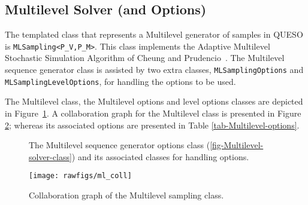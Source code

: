\subsection{Multilevel Solver (and Options)}\label{sec:ML}


The templated class that represents a Multilevel generator of samples in QUESO is \linebreak \verb+MLSampling<P_V,P_M>+. This class implements the Adaptive Multilevel Stochastic Simulation Algorithm of Cheung and Prudencio~\cite{CheungPrudencio2012}.
The Multilevel sequence generator class is assisted by two extra classes, \verb+MLSamplingOptions+ and \verb+MLSamplingLevelOptions+, for handling the options to be used.

The Multilevel class, the Multilevel options and level options classes are depicted in Figure~\ref{fig-Multilevel-options-class}.  A collaboration graph for the Multilevel class is presented in Figure \ref{fig-Multilevel-coll}; whereas its associated options are presented in Table \ref{tab-Multilevel-options}.
% 

\begin{figure}[htpb]
\centering
{}\hspace{-1.5cm}
\hspace{-1.5cm}
 \vspace{-.2cm}
\caption{The Multilevel sequence generator options class (\ref{fig-Multilevel-solver-class}) and its associated classes for handling options.}
\label{fig-Multilevel-options-class}
\end{figure}


\begin{figure}[p]
\centering
\texttt{[image: rawfigs/ml\_coll]}
 \vspace{-.8cm}
\caption{Collaboration graph of the  Multilevel sampling class.}
\label{fig-Multilevel-coll}
\end{figure}


